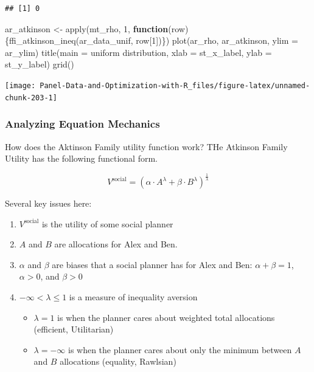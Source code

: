 \documentclass[
]{book}
\newenvironment{Shaded}{\begin{snugshade}}{\end{snugshade}}
\newcommand{\AttributeTok}[1]{\textcolor[rgb]{0.77,0.63,0.00}{#1}}
\newcommand{\ControlFlowTok}[1]{\textcolor[rgb]{0.13,0.29,0.53}{\textbf{#1}}}
\newcommand{\DecValTok}[1]{\textcolor[rgb]{0.00,0.00,0.81}{#1}}
\newcommand{\FunctionTok}[1]{\textcolor[rgb]{0.00,0.00,0.00}{#1}}
\newcommand{\NormalTok}[1]{#1}
\newcommand{\OtherTok}[1]{\textcolor[rgb]{0.56,0.35,0.01}{#1}}
\newcommand{\StringTok}[1]{\textcolor[rgb]{0.31,0.60,0.02}{#1}}
\providecommand{\tightlist}{%
  \setlength{\itemsep}{0pt}\setlength{\parskip}{0pt}}
\begin{document}
\begin{verbatim}
## [1] 0
\end{verbatim}

\begin{Shaded}
\begin{Highlighting}[]
\NormalTok{ar\_atkinson }\OtherTok{\textless{}{-}} \FunctionTok{apply}\NormalTok{(mt\_rho, }\DecValTok{1}\NormalTok{, }\ControlFlowTok{function}\NormalTok{(row)\{}\FunctionTok{ffi\_atkinson\_ineq}\NormalTok{(ar\_data\_unif, row[}\DecValTok{1}\NormalTok{])\})}
\FunctionTok{plot}\NormalTok{(ar\_rho, ar\_atkinson, }\AttributeTok{ylim =}\NormalTok{ ar\_ylim)}
\FunctionTok{title}\NormalTok{(}\AttributeTok{main =} \StringTok{\textquotesingle{}uniform distribution\textquotesingle{}}\NormalTok{, }\AttributeTok{xlab =}\NormalTok{ st\_x\_label, }\AttributeTok{ylab =}\NormalTok{ st\_y\_label)}
\FunctionTok{grid}\NormalTok{()}
\end{Highlighting}
\end{Shaded}

\begin{center}\texttt{[image: Panel-Data-and-Optimization-with-R\_files/figure-latex/unnamed-chunk-203-1]} \end{center}

\hypertarget{analyzing-equation-mechanics}{%
\subsubsection{Analyzing Equation Mechanics}\label{analyzing-equation-mechanics}}

How does the Aktinson Family utility function work? THe Atkinson Family Utility has the following functional form.

\[
V^{\text{social}}
=
\left(
\alpha
\cdot
A^{\lambda}
+
\beta
\cdot
B^{\lambda}
\right)^{\frac{1}{\lambda}}
\]

Several key issues here:

\begin{enumerate}
\def\labelenumi{\arabic{enumi}.}
\tightlist
\item
  \(V^{\text{social}}\) is the utility of some social planner
\item
  \(A\) and \(B\) are allocations for Alex and Ben.
\item
  \(\alpha\) and \(\beta\) are biases that a social planner has for Alex and Ben: \(\alpha+\beta=1\), \(\alpha>0\), and \(\beta>0\)
\item
  \(-\infty < \lambda \le 1\) is a measure of inequality aversion

  \begin{itemize}
  \tightlist
  \item
    \(\lambda=1\) is when the planner cares about weighted total allocations (efficient, Utilitarian)
  \item
    \(\lambda=-\infty\) is when the planner cares about only the minimum between \(A\) and \(B\) allocations (equality, Rawlsian)
  \end{itemize}
\end{enumerate}
\end{document}
